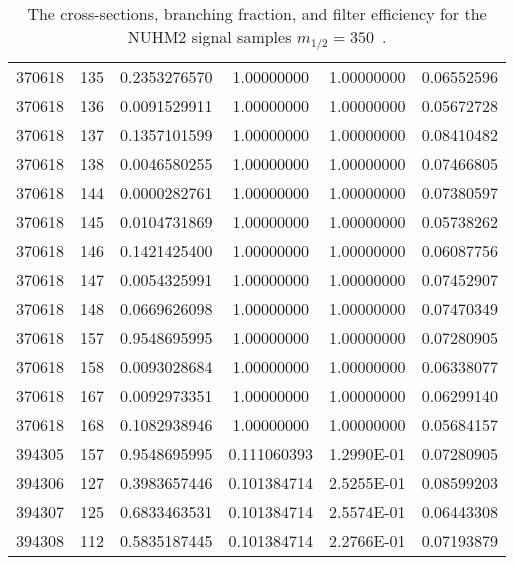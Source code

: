 \begin{table}[htp]
{{\begin{tabular}{cccccc}
370618 & 135         & 0.2353276570         & 1.00000000  & 1.00000000        & 0.06552596\\
370618 & 136         & 0.0091529911         & 1.00000000  & 1.00000000        & 0.05672728\\
370618 & 137         & 0.1357101599         & 1.00000000  & 1.00000000        & 0.08410482\\
370618 & 138         & 0.0046580255         & 1.00000000  & 1.00000000        & 0.07466805\\
370618 & 144         & 0.0000282761         & 1.00000000  & 1.00000000        & 0.07380597\\
370618 & 145         & 0.0104731869         & 1.00000000  & 1.00000000        & 0.05738262\\
370618 & 146         & 0.1421425400         & 1.00000000  & 1.00000000        & 0.06087756\\
370618 & 147         & 0.0054325991         & 1.00000000  & 1.00000000        & 0.07452907\\
370618 & 148         & 0.0669626098         & 1.00000000  & 1.00000000        & 0.07470349\\
370618 & 157         & 0.9548695995         & 1.00000000  & 1.00000000        & 0.07280905\\
370618 & 158         & 0.0093028684         & 1.00000000  & 1.00000000        & 0.06338077\\
370618 & 167         & 0.0092973351         & 1.00000000  & 1.00000000        & 0.06299140\\
370618 & 168         & 0.1082938946         & 1.00000000  & 1.00000000        & 0.05684157\\
394305 & 157         & 0.9548695995         & 0.111060393 & 1.2990E-01        & 0.07280905\\
394306 & 127         & 0.3983657446         & 0.101384714 & 2.5255E-01        & 0.08599203\\
394307 & 125         & 0.6833463531         & 0.101384714 & 2.5574E-01        & 0.06443308\\
394308 & 112         & 0.5835187445         & 0.101384714 & 2.2766E-01        & 0.07193879\\
\hline
\hline
\end{tabular}
}
}
\caption{The cross-sections, branching fraction, and filter efficiency for the NUHM2 signal samples $m_{1/2} = 350$~{\GeV}.}
\label{tab:app_xsec_m12_350}
\end{table}%

